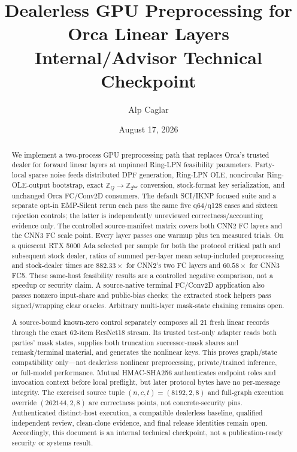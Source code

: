 \documentclass[11pt]{article}
\title{Dealerless GPU Preprocessing for Orca Linear Layers\\
\large Internal/Advisor Technical Checkpoint}
\author{Alp Caglar}
\date{August 17, 2026}
\newcommand{\Z}{\mathbb{Z}}
\newcommand{\bw}{\mathsf{bw}}
\begin{document}
\maketitle

\begin{center}
\end{center}

\begin{abstract}
We implement a two-process GPU preprocessing path that replaces Orca's trusted
dealer for forward linear layers at unpinned Ring-LPN feasibility parameters.
Party-local sparse noise feeds distributed DPF generation, Ring-LPN OLE,
noncircular Ring-OLE-output bootstrap, exact $\Z_Q\!\to\!\Z_{2^\bw}$
conversion, stock-format key serialization, and unchanged Orca FC/Conv2D
consumers. The default SCI/IKNP focused suite and a separate opt-in EMP-Silent
rerun each pass the same five q64/q128 cases and sixteen rejection controls;
the latter is independently unreviewed correctness/accounting evidence only.
The controlled source-manifest matrix covers both CNN2 FC layers and the CNN3
FC scale point. Every layer passes one warmup plus ten measured trials. On a
quiescent RTX 5000 Ada selected per sample for both the protocol critical path
and subsequent stock dealer, ratios of summed per-layer mean setup-included
preprocessing and stock-dealer times are $882.33\times$ for CNN2's two FC
layers and $60.58\times$ for CNN3 FC5. These same-host feasibility results are
a controlled negative comparison, not a speedup or security claim.
A source-native terminal FC/Conv2D application also passes nonzero input-share
and public-bias checks; the extracted stock helpers pass signed/wrapping clear
oracles. Arbitrary multi-layer mask-state chaining remains open.

A source-bound known-zero control separately composes all 21 fresh linear
records through the exact 62-item ResNet18 stream. Its trusted test-only
adapter reads both parties' mask states, supplies both truncation
successor-mask shares and remask/terminal material, and generates the nonlinear
keys. This proves graph/state compatibility only---not dealerless nonlinear
preprocessing, private/trained inference, or full-model performance. Mutual
HMAC-SHA256 authenticates endpoint roles and invocation context before local
preflight, but later protocol bytes have no per-message integrity. The
exercised source tuple $(n,c,t)=(8192,2,8)$ and full-graph execution override
$(262144,2,8)$ are correctness points, not concrete-security pins. Authenticated
distinct-host execution, a compatible dealerless baseline, qualified
independent review, clean-clone evidence, and final release identities remain
open. Accordingly, this document is an internal technical checkpoint, not a
publication-ready security or systems result.
\end{abstract}
\end{document}
